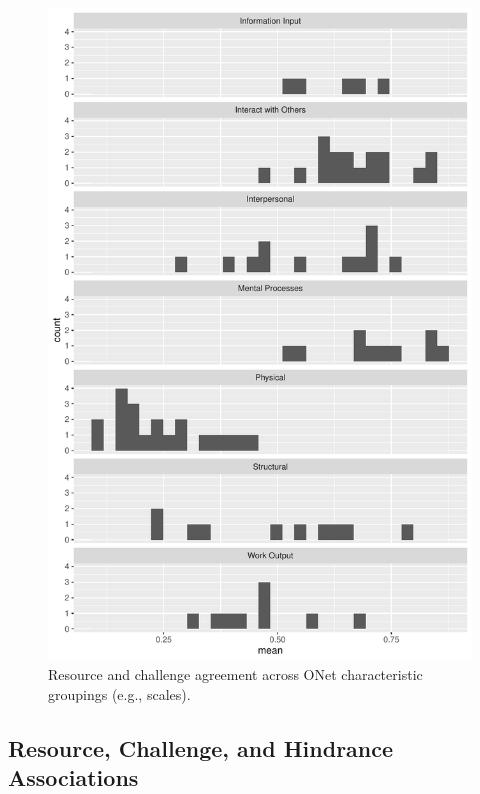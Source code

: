 \documentclass[
  jou]{apa6}
\begin{document}
\begin{figure}
\centering
\includegraphics{SIOP2024convergence_files/figure-latex/recchall-1.pdf}
\caption{\label{fig:recchall}Resource and challenge agreement across ONet characteristic groupings (e.g., scales).}
\end{figure}

\hypertarget{resource-challenge-and-hindrance-associations}{%
\subsection{Resource, Challenge, and Hindrance Associations}\label{resource-challenge-and-hindrance-associations}}
\end{document}
